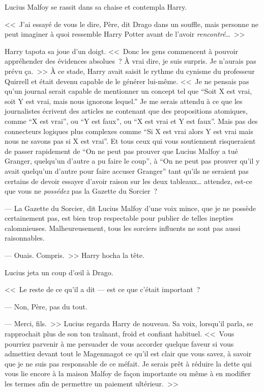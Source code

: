 Lucius Malfoy se rassit dans sa chaise et contempla Harry.

<<~J'ai essayé de vous le dire, Père, dit Drago dans un souffle, mais personne ne peut imaginer à quoi ressemble Harry Potter avant de l'avoir \emph{rencontré}…~>>

Harry tapota sa joue d'un doigt. <<~Donc les gens commencent à pouvoir appréhender des évidences absolues~? À vrai dire, je suis surpris. Je n'aurais pas prévu ça.~>> À ce stade, Harry avait saisit le rythme du cynisme du professeur Quirrell et était devenu capable de le générer lui-même. <<~Je ne pensais pas qu'un journal serait capable de mentionner un concept tel que “Soit X est vrai, soit Y est vrai, mais nous ignorons lequel.” Je me serais attendu à ce que les journalistes écrivent des articles ne contenant que des propositions atomiques, comme “X est vrai”, ou “Y est faux”, ou “X est vrai et Y est faux”. Mais pas des connecteurs logiques plus complexes comme “Si X est vrai alors Y est vrai mais nous ne savons pas si X est vrai”. Et tous ceux qui vous soutiennent risqueraient de passer rapidement de “On ne peut pas prouver que Lucius Malfoy a tué Granger, quelqu'un d'autre a pu faire le coup”, à “On ne peut pas prouver qu'il y avait quelqu'un d'autre pour faire accuser Granger” tant qu'ils ne seraient pas certains de devoir essayer d'avoir raison sur les deux tableaux… attendez, est-ce que vous ne \emph{possédez} pas la Gazette du Sorcier~?

--- La Gazette du Sorcier, dit Lucius Malfoy d'une voix mince, que je ne possède certainement pas, est bien trop respectable pour publier de telles inepties calomnieuses. Malheureusement, tous les sorciers influents ne sont pas aussi raisonnables.

--- Ouais. Compris.~>> Harry hocha la tête.

Lucius jeta un coup d'œil à Drago.

<<~Le reste de ce qu'il a dit — est ce que c'était important~?

--- Non, Père, pas du tout.

--- Merci, fils.~>> Lucius regarda Harry de nouveau. Sa voix, lorsqu'il parla, se rapprochait plus de son ton traînant, froid et confiant habituel. <<~Vous pourriez parvenir à me persuader de vous accorder quelque faveur si vous admettiez devant tout le Magenmagot ce qu'il est clair que vous savez, à savoir que je ne suis pas responsable de ce méfait. Je serais prêt à réduire la dette qui vous lie encore à la maison Malfoy de façon importante ou même à en modifier les termes afin de permettre un paiement ultérieur.~>>

